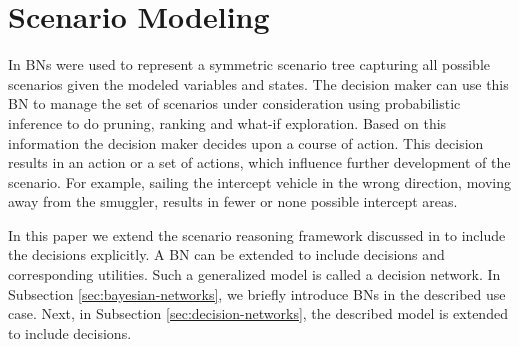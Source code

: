 \documentclass[conference]{IEEEtran}
\begin{document}
\section{Scenario Modeling}
\label{sec:influence-diagrams}

In \cite{conrado14if} BNs were used to represent a symmetric scenario tree capturing all possible scenarios given the modeled variables and states. The decision maker can use this BN to manage the set of scenarios under consideration using probabilistic inference to do pruning, ranking and what-if exploration. Based on this information the decision maker decides upon a course of action. %
This decision results in an action or a set of actions, which  influence further development of the scenario. For example, sailing the intercept vehicle in the wrong direction, moving away from the smuggler, results in fewer or none possible intercept areas. 

In this paper we extend the scenario reasoning framework discussed in \cite{conrado14if} to include the decisions explicitly. A BN can be extended to include decisions and corresponding utilities. Such a generalized model is called a decision network. In Subsection \ref{sec:bayesian-networks}, we briefly introduce BNs in the described use case. Next, in Subsection \ref{sec:decision-networks}, the described model is extended to include decisions.

\begin{figure}
\begin{center}
 \qquad
{}
 \caption{}
\end{center}
\end{figure}
\end{document}
